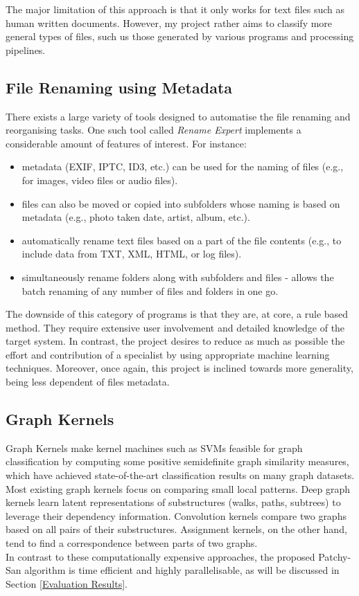The major limitation of this approach is that it only works for text files such as human written documents. However, my project rather aims to classify more general types of files, such us those generated by various programs and processing pipelines. \\

\subsection{File Renaming using Metadata}

There exists a large variety of tools designed to automatise the file renaming and reorganising tasks. One such tool called \textit{Rename Expert} implements a considerable amount of features of interest. For instance:

\begin{itemize}
  \item metadata (EXIF, IPTC, ID3, etc.) can be used for the naming of files (e.g., for images, video files or audio files).
  \item files can also be moved or copied into subfolders whose naming is based on metadata (e.g., photo taken date, artist, album, etc.).
  \item automatically rename text files based on a part of the file contents (e.g., to include data from TXT, XML, HTML, or log files).
  \item simultaneously rename folders along with subfolders and files - allows the batch renaming of any number of files and folders in one go.
\end{itemize}

The downside of this category of programs is that they are, at core, a rule based method. They require extensive user involvement and detailed knowledge of the target system. In contrast, the project desires to reduce as much as possible the effort and contribution of a specialist by using appropriate machine learning techniques. Moreover, once again, this project is inclined towards more generality, being less dependent of files metadata. \\


\subsection{Graph Kernels}

Graph Kernels make kernel machines such as SVMs feasible for graph classification by computing some positive semidefinite graph similarity measures, which have achieved state-of-the-art classification results on many graph datasets. Most existing graph kernels focus on comparing small local patterns. Deep graph kernels learn latent representations of substructures (walks, paths, subtrees) to leverage their dependency information. Convolution kernels compare two graphs based on all pairs of their substructures. Assignment kernels, on the other hand, tend to find a correspondence between parts of two graphs. \\

In contrast to these computationally expensive approaches, the proposed Patchy-San algorithm is time efficient and highly parallelisable, as will be discussed in Section \ref{Evaluation Results}.

